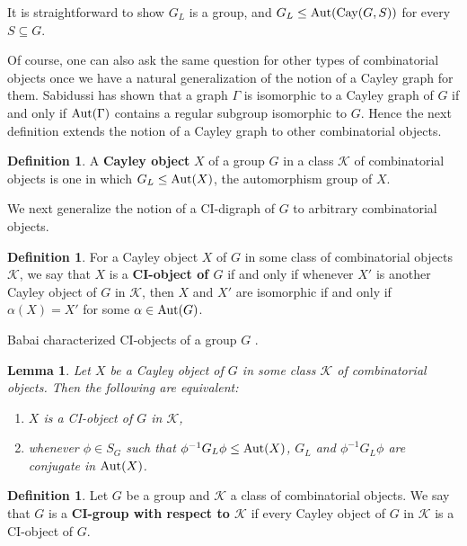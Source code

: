 \documentclass{amsart}
\newtheorem{lem}[thrm]{Lemma}
\theoremstyle{definition}
\newtheorem{definition}[thrm]{Definition}
\theoremstyle{remark}
\numberwithin{equation}{section}
\def\Aut{{\rm Aut}}
\def\cal{\mathcal}
\def\Cay{{\rm Cay}}
\begin{document}
It is straightforward to show $G_L$ is a group, and $G_L\le\Aut(\Cay(G,S))$ for every $S\subseteq G$.

Of course, one can also ask the same question for other types of combinatorial objects once we have a natural generalization of the notion of a Cayley graph for them.  Sabidussi \cite[Lemma 4]{Sabidussi1958} has shown that a graph $\Gamma$ is isomorphic to a Cayley graph of $G$ if and only if $\Aut(\Gamma)$ contains a regular subgroup isomorphic to $G$.  Hence the next definition extends the notion of a Cayley graph to other combinatorial objects.

\begin{definition}
A {\bf Cayley object} $X$ of a group $G$ in a class ${\cal K}$ of combinatorial objects is one in which $G_L\le\Aut(X)$, the automorphism group of $X$.
\end{definition}

We next generalize the notion of a CI-digraph of $G$ to arbitrary combinatorial objects.

\begin{definition}
For a Cayley object $X$ of $G$ in some class of combinatorial objects ${\cal K}$, we say that $X$ is a {\bf CI-object of $G$} if and only if whenever $X'$ is another Cayley object of $G$ in ${\cal K}$, then $X$ and $X'$ are isomorphic if and only if $\alpha(X) = X'$ for some $\alpha\in\Aut(G)$.
\end{definition}

Babai characterized CI-objects of a group $G$ \cite[Lemma 3.1]{Babai1977}.

\begin{lem}\label{CI}
Let $X$ be a Cayley object of $G$ in some class ${\cal K}$ of combinatorial objects.  Then the following are equivalent:
\begin{enumerate}
\item\label{Ciso1} $X$ is a CI-object of $G$ in ${\cal K}$,
\item\label{Ciso2} whenever $\phi\in S_G$ such that $\phi^{-1}G_L\phi\le\Aut(X)$, $G_L$ and $\phi^{-1}G_L\phi$ are conjugate in $\Aut(X)$.
\end{enumerate}
\end{lem}

\begin{definition}
Let $G$ be a group and ${\cal K}$ a class of combinatorial objects.  We say that $G$ is a {\bf CI-group with respect to ${\cal K}$} if every Cayley object of $G$ in ${\cal K}$ is a CI-object of $G$.
\end{definition}
\end{document}
